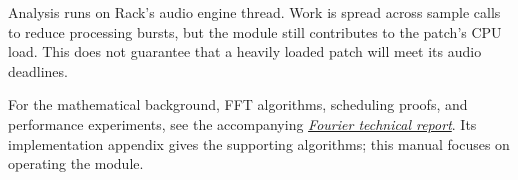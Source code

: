 \documentclass[12pt,letterpaper]{article}
\begin{document}
Analysis runs on Rack's audio engine thread. Work is spread across sample
calls to reduce processing bursts, but the module still contributes to the
patch's CPU load. This does not guarantee that a heavily loaded patch will
meet its audio deadlines.

For the mathematical background, FFT algorithms, scheduling proofs, and
performance experiments, see the accompanying
\href{https://github.com/Kautenja/ArhythmeticUnits-Fourier/tree/main/whitepaper}{\textit{Fourier technical report}}.
Its implementation appendix gives the supporting algorithms; this manual
focuses on operating the module.


\clearpage
\finalPage
\end{document}
